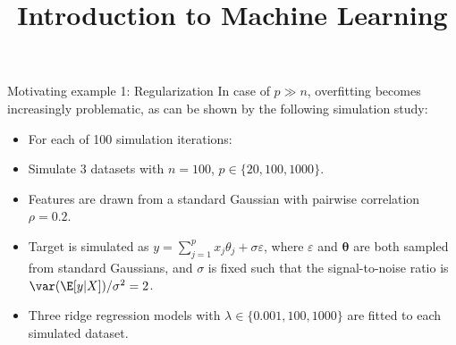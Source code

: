 \documentclass[11pt,compress,t,notes=noshow, xcolor=table]{beamer}
\title{Introduction to Machine Learning}
\begin{document}
    

\begin{vbframe}{Motivating example 1: Regularization}
  In case of $p \gg n$,  overfitting becomes increasingly problematic, as can be shown by the following simulation study:

  \begin{itemize}
    \item For each of 100 simulation iterations:
    \item Simulate 3 datasets with $n=100$, $p \in \{ 20, 100, 1000 \}$.
    \item Features are drawn from a standard Gaussian with pairwise correlation $\rho=0.2$.
      \item Target is simulated as
    $ y = \sum_{j=1}^p x_j \theta_j + \sigma\varepsilon $, where $\varepsilon$ and $\bm{\theta}$ are both sampled from standard Gaussians, and $\sigma$ is fixed such that the signal-to-noise ratio is $\var (\E[y|X]) / \sigma^2 = 2$.
    \item Three ridge regression models with $\lambda \in \{ 0.001, 100, 1000 \}$ are fitted to each simulated dataset.
  \end{itemize}

  \framebreak


\end{vbframe}
\end{document}
